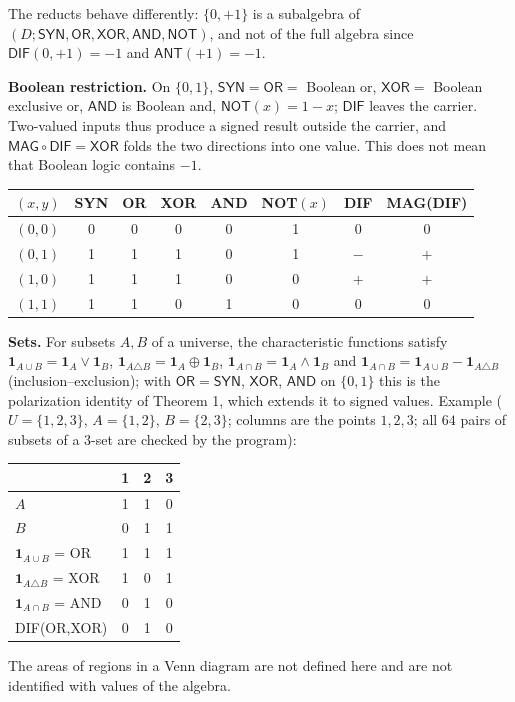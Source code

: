 \documentclass[10pt,a4paper]{article}
\newcommand{\D}{D}\newcommand{\Z}{\mathcal Z}\newcommand{\SYN}{\mathsf{SYN}}\newcommand{\DIF}{\mathsf{DIF}}\newcommand{\OR}{\mathsf{OR}}\newcommand{\XOR}{\mathsf{XOR}}\newcommand{\AND}{\mathsf{AND}}\newcommand{\NOT}{\mathsf{NOT}}\newcommand{\ANT}{\mathsf{ANT}}\newcommand{\MAX}{\mathsf{MAX}}\newcommand{\MIN}{\mathsf{MIN}}\newcommand{\MAG}{\mathsf{MAG}}\newcommand{\chai}{Chai}\newcommand{\Fone}{\mathcal F_1}\newcommand{\Ftwo}{\mathcal F_2}\usepackage{tikz}\usetikzlibrary{arrows.meta,positioning}\newcommand{\yang}{\rule{0.8em}{0.18ex}}\newcommand{\yin}{\rule{0.25em}{0.18ex}\hspace{0.3em}\rule{0.25em}{0.18ex}}\newcommand{\tri}[3]{\raisebox{-0.01ex}{\shortstack[c]{#1\\[-0.3ex]#2\\[-0.3ex]#3}}}\newcommand{\iv}[1]{[\![#1]\!]}
\begin{document}
The reducts behave differently: $\{0,+1\}$ is a subalgebra of $(\D;\mathsf{SYN},\mathsf{OR},\mathsf{XOR},\mathsf{AND},\mathsf{NOT})$, and not of the full algebra since $\mathsf{DIF}(0,+1)=-1$ and $\mathsf{ANT}(+1)=-1$.

\textbf{Boolean restriction.} On $\{0,1\}$, $\mathsf{SYN}=\mathsf{OR}=$ Boolean or, $\mathsf{XOR}=$ Boolean exclusive or, $\mathsf{AND}$ is Boolean and, $\mathsf{NOT}(x)=1-x$; $\mathsf{DIF}$ leaves the carrier. Two-valued inputs thus produce a signed result outside the carrier, and $\mathsf{MAG}\circ\mathsf{DIF}=\mathsf{XOR}$ folds the two directions into one value. This does not mean that Boolean logic contains $-1$.
\begin{center}\small\begin{tabular}{cccccccc}\toprule $(x,y)$&SYN&OR&XOR&AND&NOT$(x)$&DIF&MAG(DIF)\\\midrule
$(0,0)$&0&0&0&0&1&$0$&$0$\\ $(0,1)$&1&1&1&0&1&$-$&$+$\\ $(1,0)$&1&1&1&0&0&$+$&$+$\\ $(1,1)$&1&1&0&1&0&$0$&$0$\\
\bottomrule\end{tabular}\end{center}
\textbf{Sets.} For subsets $A,B$ of a universe, the characteristic functions satisfy $\mathbf 1_{A\cup B}=\mathbf 1_A\vee\mathbf 1_B$, $\mathbf 1_{A\triangle B}=\mathbf 1_A\oplus\mathbf 1_B$, $\mathbf 1_{A\cap B}=\mathbf 1_A\wedge\mathbf 1_B$ and $\mathbf 1_{A\cap B}=\mathbf 1_{A\cup B}-\mathbf 1_{A\triangle B}$ (inclusion--exclusion); with $\mathsf{OR}=\mathsf{SYN}$, $\mathsf{XOR}$, $\mathsf{AND}$ on $\{0,1\}$ this is the polarization identity of Theorem 1, which extends it to signed values. Example ($U=\{1,2,3\}$, $A=\{1,2\}$, $B=\{2,3\}$; columns are the points $1,2,3$; all $64$ pairs of subsets of a $3$-set are checked by the program):
\begin{center}\small\begin{tabular}{lccc}\toprule &1&2&3\\\midrule
$A$&1&1&0\\ $B$&0&1&1\\ $\mathbf 1_{A\cup B}$ = OR&1&1&1\\ $\mathbf 1_{A\triangle B}$ = XOR&1&0&1\\ $\mathbf 1_{A\cap B}$ = AND&0&1&0\\ DIF(OR,XOR)&0&1&0\\
\bottomrule\end{tabular}\end{center}
The areas of regions in a Venn diagram are not defined here and are not identified with values of the algebra.
\end{document}
